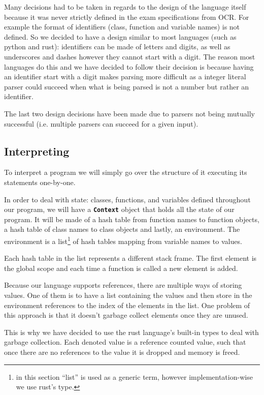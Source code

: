 \documentclass{article}
\begin{document}
Many decisions had to be taken in regards to the design of the language itself
because it was never strictly defined in the exam specifications from OCR. For
example the format of identifiers (class, function and variable names) is not
defined. So we decided to have a design similar to most languages (such as
python and rust): identifiers can be made of letters and digits, as well as
underscores and dashes however they cannot start with a digit. The reason most
languages do this and we have decided to follow their decision is because
having an identifier start with a digit makes parsing more difficult as a
integer literal parser could succeed when what is being parsed is not a number
but rather an identifier.

The last two design decisions have been made due to parsers not being mutually
successful (i.e. multiple parsers can succeed for a given input).

\subsection{Interpreting}

To interpret a program we will simply go over the structure of it executing its
statements one-by-one.

In order to deal with state: classes, functions, and variables defined
throughout our program, we will have a \textbf{\texttt{Context}} object that
holds all the state of our program. It will be made of a hash table from
function names to function objects, a hash table of class names to class
objects and lastly, an environment. The environment is a list\footnote{in this
section ``list'' is used as a generic term, however implementation-wise we use
rust's  type.} of hash tables mapping from variable names to
values.

Each hash table in the list represents a different stack frame. The first
element is the global scope and each time a function is called a new element is
added.

Because our language supports references, there are multiple ways of storing
values. One of them is to have a list containing the values and then store in
the environment references to the index of the elements in the list. One
problem of this approach is that it doesn't garbage collect elements once they
are unused.

This is why we have decided to use the rust language's built-in types to deal
with garbage collection. Each denoted value is a reference counted value, such
that once there are no references to the value it is dropped and memory is
freed.
\end{document}
